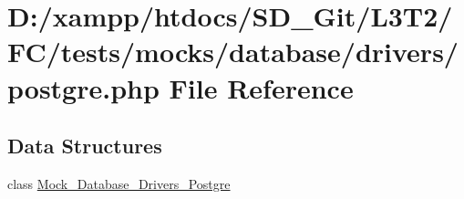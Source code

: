 \hypertarget{tests_2mocks_2database_2drivers_2postgre_8php}{}\section{D\+:/xampp/htdocs/\+S\+D\+\_\+\+Git/\+L3\+T2/\+F\+C/tests/mocks/database/drivers/postgre.php File Reference}
\label{tests_2mocks_2database_2drivers_2postgre_8php}
\subsection*{Data Structures}
\begin{DoxyCompactItemize}
\item 
class \hyperlink{class_mock___database___drivers___postgre}{Mock\+\_\+\+Database\+\_\+\+Drivers\+\_\+\+Postgre}
\end{DoxyCompactItemize}
